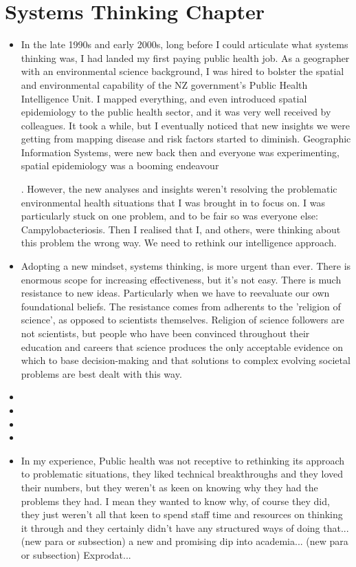 \section*{Systems Thinking Chapter}
\begin{itemize}
	\item {} In the late 1990s and early 2000s, long before I could articulate what systems thinking was, I had landed my first paying public health job. As a geographer with an environmental science background, I was hired to bolster the spatial and environmental capability of the NZ government's Public Health Intelligence Unit. I mapped everything, and even introduced spatial epidemiology to the public health sector, and it was very well received by colleagues. It took a while, but I eventually noticed that new insights we were getting from mapping disease and risk factors started to diminish. Geographic Information Systems, were new back then and everyone was experimenting, spatial epidemiology was a booming endeavour
	
	
	. However, the new analyses and insights weren't resolving the problematic environmental health situations that I was brought in to focus on. I was particularly stuck on one problem, and to be fair so was everyone else: Campylobacteriosis. Then I realised that I, and others, were thinking about this problem the wrong way. We need to rethink our intelligence approach.
	\item {} Adopting a new mindset, systems thinking, is more urgent than ever. There is enormous scope for increasing effectiveness, but it's not easy. There is much resistance to new ideas. Particularly when we have to reevaluate our own foundational beliefs. The resistance comes from adherents to the 'religion of science', as opposed to scientists themselves. Religion of science followers are not scientists, but people who have been convinced throughout their education and careers that science produces the only acceptable evidence on which to base decision-making and that solutions to complex evolving societal problems are best dealt with this way.
	\item {}
	\item {}
	\item {}
	\item {}
	\item {} In my experience, Public health was not receptive to rethinking its approach to problematic situations, they liked technical breakthroughs and they loved their numbers, but they weren't as keen on knowing why they had the problems they had. I mean they wanted to know why, of course they did, they just weren't all that keen to spend staff time and resources on thinking it through and they certainly didn't have any structured ways of doing that... (new para or subsection) a new and promising dip into academia... (new para or subsection) Exprodat...
\end{itemize}

